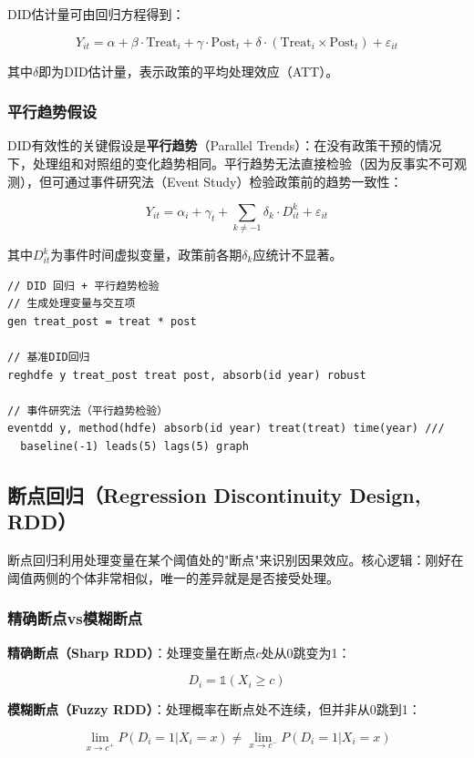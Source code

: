 DID估计量可由回归方程得到：

\[
Y_{it} = \alpha + \beta \cdot \text{Treat}_i + \gamma \cdot \text{Post}_t + \delta \cdot (\text{Treat}_i \times \text{Post}_t) + \varepsilon_{it}
\]

其中$\delta$即为DID估计量，表示政策的平均处理效应（ATT）。

\subsubsection{平行趋势假设}

DID有效性的关键假设是\textbf{平行趋势}（Parallel Trends）：在没有政策干预的情况下，处理组和对照组的变化趋势相同。平行趋势无法直接检验（因为反事实不可观测），但可通过事件研究法（Event Study）检验政策前的趋势一致性：

\[
Y_{it} = \alpha_i + \gamma_t + \sum_{k \neq -1} \delta_k \cdot D_{it}^k + \varepsilon_{it}
\]

其中$D_{it}^k$为事件时间虚拟变量，政策前各期$\delta_k$应统计不显著。

\begin{lstlisting}[style=stata]
// DID 回归 + 平行趋势检验
// 生成处理变量与交互项
gen treat_post = treat * post

// 基准DID回归
reghdfe y treat_post treat post, absorb(id year) robust

// 事件研究法（平行趋势检验）
eventdd y, method(hdfe) absorb(id year) treat(treat) time(year) ///
  baseline(-1) leads(5) lags(5) graph
\end{lstlisting}

\subsection{断点回归（Regression Discontinuity Design, RDD）}

断点回归利用处理变量在某个阈值处的"断点"来识别因果效应。核心逻辑：刚好在阈值两侧的个体非常相似，唯一的差异就是是否接受处理。

\subsubsection{精确断点vs模糊断点}

\textbf{精确断点（Sharp RDD）}：处理变量在断点$c$处从0跳变为1：

\[
D_i = \mathbb{1}(X_i \geq c)
\]

\textbf{模糊断点（Fuzzy RDD）}：处理概率在断点处不连续，但并非从0跳到1：

\[
\lim_{x \to c^+} P(D_i=1|X_i=x) \neq \lim_{x \to c^-} P(D_i=1|X_i=x)
\]

